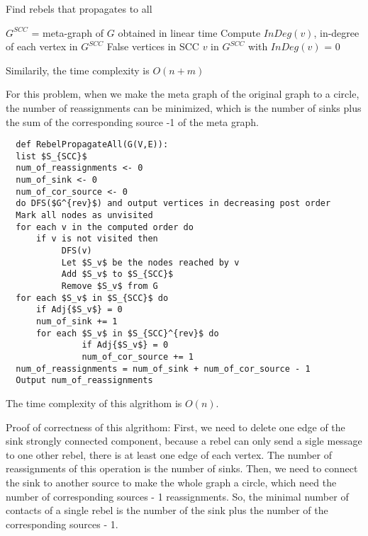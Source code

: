 \documentclass[12pt,a4paper]{article}
\newcommand{\question}[1]{\bigskip\noindent{\textbf{Q{#1} solution}}}
\begin{document}
\begin{algorithm}
\caption{Find rebels that propagates to all}\label{alg:q24A}
\begin{algorithmic}
    \State $G^{SCC}$ = meta-graph of $G$ obtained in linear time
    \State Compute $InDeg(v)$, in-degree of each vertex in $G^{SCC}$
      \State \Return False
    \Else
      \State \Return vertices in SCC $v$ in $G^{SCC}$ with $InDeg(v)$ = 0
    \EndIf
  \EndFunction
\end{algorithmic}
\end{algorithm}

Similarily, the time complexity is $O(n + m)$

\question{24.D}

For this problem, when we make the meta graph of the original graph to a circle, the number of reassignments can be minimized, which is the number of sinks plus the sum of the corresponding source -1 of the meta graph.

\begin{lstlisting}
  def RebelPropagateAll(G(V,E)):
  list $S_{SCC}$
  num_of_reassignments <- 0
  num_of_sink <- 0
  num_of_cor_source <- 0
  do DFS($G^{rev}$) and output vertices in decreasing post order
  Mark all nodes as unvisited
  for each v in the computed order do
      if v is not visited then 
           DFS(v)
           Let $S_v$ be the nodes reached by v
           Add $S_v$ to $S_{SCC}$
           Remove $S_v$ from G
  for each $S_v$ in $S_{SCC}$ do
      if Adj{$S_v$} = 0
      num_of_sink += 1
      for each $S_v$ in $S_{SCC}^{rev}$ do
               if Adj{$S_v$} = 0
               num_of_cor_source += 1
  num_of_reassignments = num_of_sink + num_of_cor_source - 1
  Output num_of_reassignments        
\end{lstlisting}

The time complexity of this algrithom is $O(n)$.

Proof of correctness of this algrithom:
First, we need to delete one edge of the sink strongly connected component, because a rebel can only send a sigle message to one other rebel, there is at least one edge of each vertex. The number of reassignments of this operation is the number of sinks.
Then, we need to connect the sink to another source to make the whole graph a circle, which need the number of corresponding sources - 1 reassignments. So, the minimal number of contacts of a single rebel is the number of the sink plus the number of the corresponding sources - 1.
\end{document}
